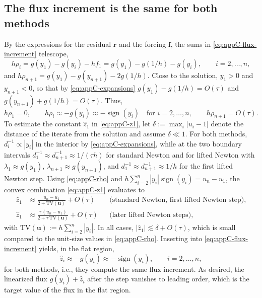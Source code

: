 \documentclass[11pt,pdflatex,sn-mathphys-num]{sn-jnl}
\theoremstyle{thmstyleone}%
\theoremstyle{thmstyletwo}%
\theoremstyle{thmstylethree}%
\newcommand{\bs}[1]{\ensuremath{\boldsymbol{#1}}}
\begin{document}
\subsection{The flux increment is the same for both methods}
By the expressions for the residual $\bs r$ and the forcing $\bs f$, the sums in \eqref{eq:appC-flux-increment} telescope,
\begin{equation*}
  h\rho_i=g(y_1)-g(y_i)-hf_1=g(y_1)-g(1/h)-g(y_i),\qquad i=2,\dots,n,
\end{equation*}
and $h\rho_{n+1}=g(y_1)-g(y_{n+1})-2g(1/h)$. Close to the solution, $y_1>0$ and $y_{n+1}<0$, so that by \eqref{eq:appC-expansions} $g(y_1)-g(1/h)=O(\tau)$ and $g(y_{n+1})+g(1/h)=O(\tau)$. Thus,
\begin{equation}\label{eq:appC-rho}
  h\rho_1=0,\qquad h\rho_i\approx-g(y_i)\approx-\operatorname{sign}(y_i)\quad \text{for $i=2,\dots,n$},\qquad h\rho_{n+1}=O(\tau).
\end{equation}
To estimate the constant $\hat z_1$ in \eqref{eq:appC-z1}, let $\delta:=\max_i|u_i-1|$ denote the distance of the iterate from the solution and assume $\delta\ll1$. For both methods, $d_i^{-1}\propto|y_i|$ in the interior by \eqref{eq:appC-expansions}, while at the two boundary intervals $d_1^{-1}\approx d_{n+1}^{-1}\approx1/(\tau h)$ for standard Newton and for lifted Newton with $\lambda_1\approx g(y_1)$, $\lambda_{n+1}\approx g(y_{n+1})$, and $d_1^{-1}\approx d_{n+1}^{-1}\approx1/h$ for the first lifted Newton step. Using \eqref{eq:appC-rho} and $h\sum_{i=2}^n|y_i|\operatorname{sign}(y_i)=u_n-u_1$, the convex combination \eqref{eq:appC-z1} evaluates to
\begin{equation*}
\begin{aligned}
  \hat z_1&\approx\frac{u_n-u_1}{2+\mathrm{TV}(\bs u)}+O(\tau)&&\text{(standard Newton, first lifted Newton step)},\\
  \hat z_1&\approx\frac{\tau\,(u_n-u_1)}{2+\tau\,\mathrm{TV}(\bs u)}+O(\tau)&&\text{(later lifted Newton steps)},
\end{aligned}
\end{equation*}
with $\mathrm{TV}(\bs u):=h\sum_{i=2}^n|y_i|$. In all cases, $|\hat z_1|\lesssim\delta+O(\tau)$, which is small compared to the unit-size values in \eqref{eq:appC-rho}. Inserting into \eqref{eq:appC-flux-increment} yields, in the flat region,
\begin{equation}\label{eq:appC-z-flat}
  \hat z_i\approx-g(y_i)\approx-\operatorname{sign}(y_i),\qquad i=2,\dots,n,
\end{equation}
for both methods, i.e., they compute the same flux increment. As desired, the linearized flux $g(y_i)+\hat z_i$ after the step vanishes to leading order, which is the target value of the flux in the flat region.
\end{document}
